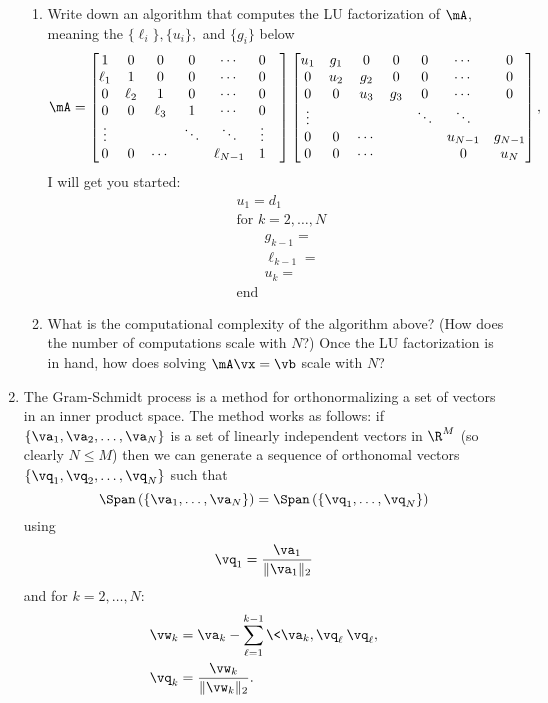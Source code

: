 \documentclass[11pt]{article}
\begin{document}
\begin{enumerate}
\begin{enumerate}
	\item Write down an algorithm that computes the LU factorization of $\mA$, meaning the $\{\ell_i\},\{u_i\},$ and $\{g_i\}$ below
	\[
		\mA = 
		\begin{bmatrix}
			1 & 0 & 0 & 0 & \cdots & 0 \\
			\ell_1 & 1 & 0 & 0 & \cdots & 0 \\
			0 & \ell_2 & 1 & 0 & \cdots & 0 \\
			0 & 0 & \ell_3 & 1 & \cdots & 0 \\
			\vdots & & & \ddots & \ddots & \vdots  & \\
			0 & 0 & \cdots & & \ell_{N-1} & 1  \\
		\end{bmatrix}
		\begin{bmatrix}
			u_1 & g_1 & 0 & 0 & 0 & \cdots & 0 \\
			0 & u_2 & g_2 & 0 & 0 & \cdots & 0 \\
			0 & 0 & u_3 & g_3 & 0 & \cdots & 0 \\
			\vdots & & & & \ddots & \ddots \\
			0 & 0 & \cdots  & & &  u_{N-1} & g_{N-1} \\
			0 & 0 &  \cdots & & & 0 & u_{N}
		\end{bmatrix},
	\]
	I will get you started:
	\begin{align*}
		&u_1 = d_1 \\
		&\text{for~}k=2,\ldots,N \\
		&\qquad g_{k-1} = \\
		&\qquad \ell_{k-1} = \\
		&\qquad u_k = \\
		&\text{end}
	\end{align*}

	\item What is the computational complexity of the algorithm above? (How does the number of computations scale with $N$?)  Once the LU factorization is in hand, how does solving $\mA\vx=\vb$ scale with $N$?
\end{enumerate}

\vspace{4mm} 
\item The Gram-Schmidt process is a method for orthonormalizing a set of vectors in an inner product space. The method works as follows: if $\{\va_1,\va_2,\ldots,\va_N\}$ is a set of linearly independent vectors in $\R^M$  (so clearly $N\leq M$) then we can generate a sequence of orthonomal vectors $\{\vq_1,\vq_2,\ldots,\vq_N\}$ such that
\[
	\Span\left(\{\va_1,\ldots,\va_N\}\right) = \Span\left(\{\vq_1,\ldots,\vq_N\}\right)
\]
using 
\[
	\vq_1 = \frac{\va_1}{\|\va_1\|_2}
\]
and for $k=2,\ldots,N$:
\begin{align*}
	\vw_k &= \va_k - \sum_{\ell=1}^{k-1}\<\va_k,\vq_\ell\>\vq_\ell, \\
	\vq_k &= \frac{\vw_k}{\|\vw_k\|_2}.
\end{align*}
\begin{enumerate}


\end{enumerate}
\end{enumerate}
\end{document}
